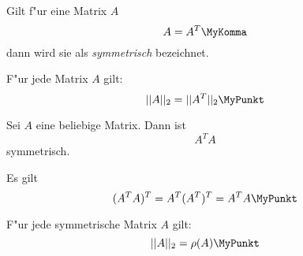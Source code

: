 \MyBeginDef
\label{DefSymmetrisch}
 
    Gilt f"ur eine Matrix $A$ \[ A = A^T \MyKomma \] dann wird sie als
    {\em symmetrisch} bezeichnet.
\MyEndDef

\begin{lemma}
\label{SatzTransponiertNorm}
    F"ur jede Matrix $A$ gilt:
    \[ ||A||_2 = ||A^T||_2 \MyPunkt \]
\end{lemma}

\begin{lemma}
\label{SatzBeliebigSymmetrisch}
    Sei $A$ eine beliebige Matrix. Dann ist \[ A^T A \] symmetrisch.
\end{lemma}
\begin{beweis}
   Es gilt \[ (A^T A)^T = A^T(A^T)^T = A^T A \MyPunkt \]
\end{beweis}
 
\begin{lemma}
\label{SatzSymmetrischSpektral}
    F"ur jede symmetrische Matrix $A$ gilt:
    \[ ||A||_2 = \rho(A) \MyPunkt \]
\end{lemma}


